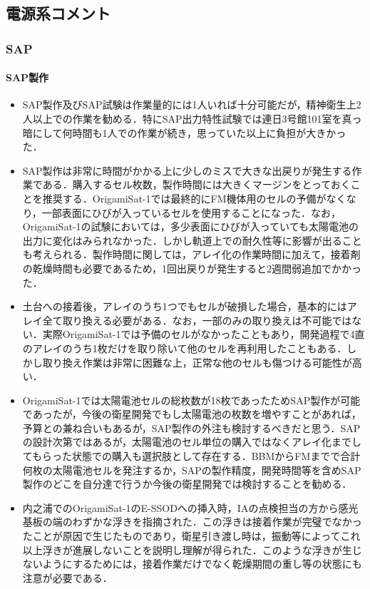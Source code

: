 \subsection{電源系コメント}

\subsubsection{SAP}
\paragraph{SAP製作}
\begin{itemize}
	\item SAP製作及びSAP試験は作業量的には1人いれば十分可能だが，精神衛生上2人以上での作業を勧める．特にSAP出力特性試験では連日3号館101室を真っ暗にして何時間も1人での作業が続き，思っていた以上に負担が大きかった．
	\item SAP製作は非常に時間がかかる上に少しのミスで大きな出戻りが発生する作業である．購入するセル枚数，製作時間には大きくマージンをとっておくことを推奨する．OrigamiSat-1では最終的にFM機体用のセルの予備がなくなり，一部表面にひびが入っているセルを使用することになった．なお，OrigamiSat-1の試験においては，多少表面にひびが入っていても太陽電池の出力に変化はみられなかった．しかし軌道上での耐久性等に影響が出ることも考えられる．製作時間に関しては，アレイ化の作業時間に加えて，接着剤の乾燥時間も必要であるため，1回出戻りが発生すると2週間弱追加でかかった．
	\item 土台への接着後，アレイのうち1つでもセルが破損した場合，基本的にはアレイ全て取り換える必要がある．なお，一部のみの取り換えは不可能ではない．実際OrigamiSat-1では予備のセルがなかったこともあり，開発過程で4直のアレイのうち1枚だけを取り除いて他のセルを再利用したこともある．しかし取り換え作業は非常に困難な上，正常な他のセルも傷つける可能性が高い．
	\item OrigamiSat-1では太陽電池セルの総枚数が18枚であったためSAP製作が可能であったが，今後の衛星開発でもし太陽電池の枚数を増やすことがあれば，予算との兼ね合いもあるが，SAP製作の外注も検討するべきだと思う．SAPの設計次第ではあるが，太陽電池のセル単位の購入ではなくアレイ化までしてもらった状態での購入も選択肢として存在する．BBMからFMまでで合計何枚の太陽電池セルを発注するか，SAPの製作精度，開発時間等を含めSAP製作のどこを自分達で行うか今後の衛星開発では検討することを勧める．
	\item 内之浦でのOrigamiSat-1のE-SSODへの挿入時，IAの点検担当の方から感光基板の端のわずかな浮きを指摘された．この浮きは接着作業が完璧でなかったことが原因で生じたものであり，衛星引き渡し時は，振動等によってこれ以上浮きが進展しないことを説明し理解が得られた．このような浮きが生じないようにするためには，接着作業だけでなく乾燥期間の重し等の状態にも注意が必要である．
\end{itemize}
